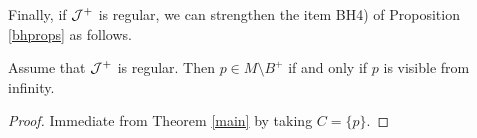 Finally, if ${\cal J}^+$ is regular, we can strengthen the item BH4) of Proposition \ref{bhprops} as follows.
\begin{corollary}
  Assume that ${\cal J}^+$ is regular. Then $p \in M \setminus B^+$ if and only if $p$ is visible from infinity.
\end{corollary}
\begin{proof}
Immediate from Theorem \ref{main} by taking $C= \{p\}$.
\end{proof}

